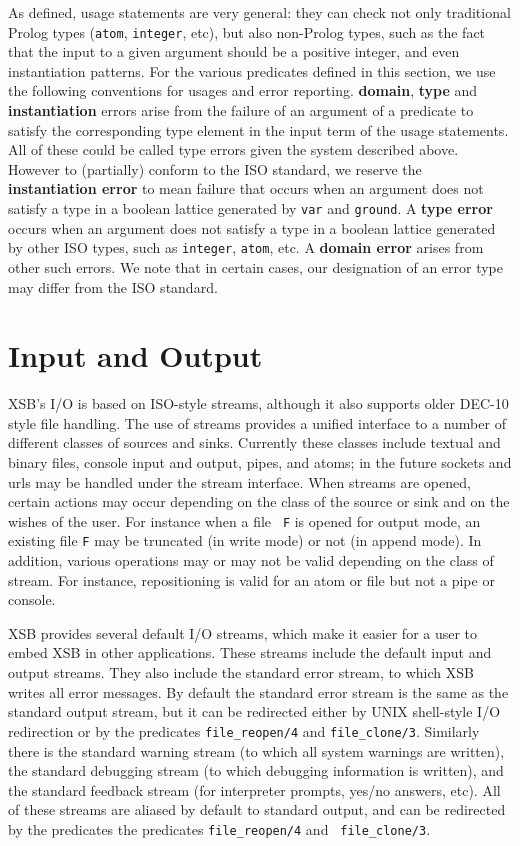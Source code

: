 As defined, usage statements are very general: they can check not only
traditional Prolog types ({\tt atom}, {\tt integer}, etc), but also
non-Prolog types, such as the fact that the input to a given argument
should be a positive integer, and even instantiation patterns.  For
the various predicates defined in this section, we use the following
conventions for usages and error reporting.  {\bf domain}, {\bf type}
and {\bf instantiation} errors arise from the failure of an argument
of a predicate to satisfy the corresponding type element in the input
term of the usage statements.  All of these could be called type
errors given the system described above.  However to (partially)
conform to the ISO standard, we reserve the {\bf instantiation error}
to mean failure that occurs when an argument does not satisfy a type
in a boolean lattice generated by {\tt var} and {\tt ground}.  A {\bf
  type error} occurs when an argument does not satisfy a type in a
boolean lattice generated by other ISO types, such as {\tt integer},
{\tt atom}, etc.  A {\bf domain error} arises from other such errors.
We note that in certain cases, our designation of an error type may
differ from the ISO standard.

\section{Input and Output}

XSB's I/O is based on ISO-style streams, although it also supports
older DEC-10 style file handling.  The use of streams provides a
unified interface to a number of different classes of sources and
sinks.  Currently these classes include textual and binary files,
console input and output, pipes, and atoms; in the future sockets and
urls may be handled under the stream interface.  When streams are
opened, certain actions may occur depending on the class of the source
or sink and on the wishes of the user.  For instance when a file {\tt
F} is opened for output mode, an existing file {\tt F} may be
truncated (in write mode) or not (in append mode).  In addition,
various operations may or may not be valid depending on the class of
stream.  For instance, repositioning is valid for an atom or file but
not a pipe or console.

XSB provides several default I/O streams, which make it easier for a
user to embed XSB in other applications.  These streams include the
default input and output streams.  They also include the standard
error stream, to which XSB writes all error messages.  By default the
standard error stream is the same as the standard output stream, but
it can be redirected either by UNIX shell-style I/O redirection or by
the predicates {\tt file\_reopen/4} and {\tt file\_clone/3}.
Similarly there is the standard warning stream (to which all system
warnings are written), the standard debugging stream (to which
debugging information is written), and the standard feedback stream
(for interpreter prompts, yes/no answers, etc).  All of these streams
are aliased by default to standard output, and can be redirected by
the predicates the predicates {\tt file\_reopen/4} and {\tt
file\_clone/3}.

